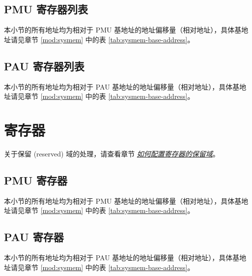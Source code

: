\documentclass[main\_\_CN.tex]{subfiles}
\begin{document}
\subsection{PMU 寄存器列表}
本小节的所有地址均为相对于 PMU 基地址的地址偏移量（相对地址），具体基地址请见章节 \ref{mod:sysmem} \textit{} 中的表 \ref{tab:sysmem-base-address}。




\subsection{PAU 寄存器列表}
本小节的所有地址均为相对于 PAU 基地址的地址偏移量（相对地址），具体基地址请见章节 \ref{mod:sysmem} \textit{} 中的表 \ref{tab:sysmem-base-address}。



\newpage
\section{寄存器}
关于保留 (reserved) 域的处理，请查看章节 \hyperref[programming-reserved-field]{\textit{如何配置寄存器的保留域}}。

\subsection{PMU 寄存器}

本小节的所有地址均为相对于 PMU 基地址的地址偏移量（相对地址），具体基地址请见章节 \ref{mod:sysmem} \textit{} 中的表 \ref{tab:sysmem-base-address}。


\subsection{PAU 寄存器}
本小节的所有地址均为相对于 PAU 基地址的地址偏移量（相对地址），具体基地址请见章节 \ref{mod:sysmem} \textit{} 中的表 \ref{tab:sysmem-base-address}。


\end{document}
